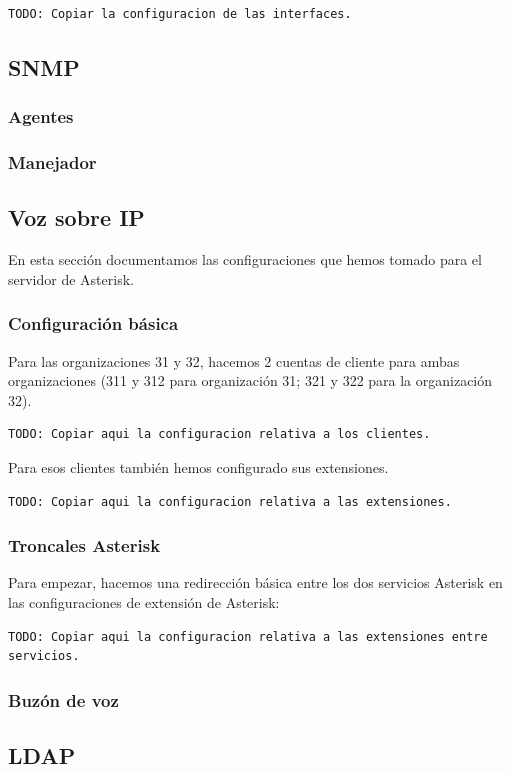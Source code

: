 \documentclass[]{article}
\begin{document}
\begin{lstlisting}
TODO: Copiar la configuracion de las interfaces.
\end{lstlisting}


\subsection{SNMP}

\subsubsection{Agentes}

\subsubsection{Manejador}

\subsection{Voz sobre IP}

En esta sección documentamos las configuraciones que hemos tomado para el servidor de Asterisk.

\subsubsection{Configuración básica}

Para las organizaciones 31 y 32, hacemos 2 cuentas de cliente para ambas organizaciones (311 y 312 para organización 31; 321 y 322 para la organización 32).

\begin{lstlisting}
TODO: Copiar aqui la configuracion relativa a los clientes.
\end{lstlisting}

Para esos clientes también hemos configurado sus extensiones.

\begin{lstlisting}
TODO: Copiar aqui la configuracion relativa a las extensiones.
\end{lstlisting}

\subsubsection{Troncales Asterisk}

Para empezar, hacemos una redirección básica entre los dos servicios Asterisk en las configuraciones de extensión de Asterisk:

\begin{lstlisting}
TODO: Copiar aqui la configuracion relativa a las extensiones entre servicios.
\end{lstlisting}

\subsubsection{Buzón de voz}

\subsection{LDAP}
\end{document}

